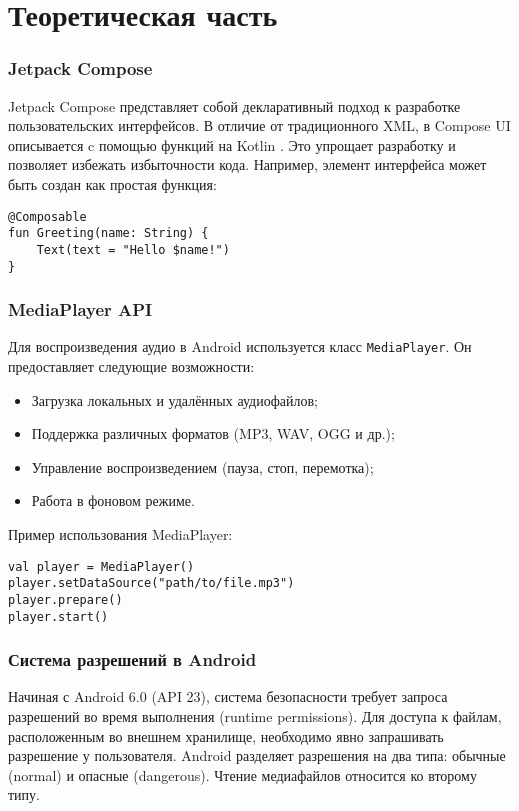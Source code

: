\chapter{Теоретическая часть}

\subsection{Jetpack Compose}
Jetpack Compose представляет собой декларативный подход к разработке пользовательских интерфейсов.
В отличие от традиционного XML, в Compose UI описывается c помощью функций на Kotlin \cite{kotlin-doc}.
Это упрощает разработку и позволяет избежать избыточности кода.
Например, элемент интерфейса может быть создан как простая функция:

\begin{lstlisting}
@Composable
fun Greeting(name: String) {
    Text(text = "Hello $name!")
}
\end{lstlisting}


\subsection{MediaPlayer API}
Для воспроизведения аудио в Android используется класс \texttt{MediaPlayer}\cite{android-mediaplayer}. Он предоставляет следующие возможности:
\begin{itemize}
  \item Загрузка локальных и удалённых аудиофайлов;
  \item Поддержка различных форматов (MP3, WAV, OGG и др.);
  \item Управление воспроизведением (пауза, стоп, перемотка);
  \item Работа в фоновом режиме.
\end{itemize}

Пример использования MediaPlayer:

\begin{lstlisting}
val player = MediaPlayer()
player.setDataSource("path/to/file.mp3")
player.prepare()
player.start()
\end{lstlisting}

\subsection{Система разрешений в Android}

Начиная с Android 6.0 (API 23), система безопасности требует запроса разрешений во время выполнения (runtime permissions). Для доступа к файлам, расположенным во внешнем хранилище, необходимо явно запрашивать разрешение у пользователя. Android разделяет разрешения на два типа: обычные (normal) и опасные (dangerous). Чтение медиафайлов относится ко второму типу.

